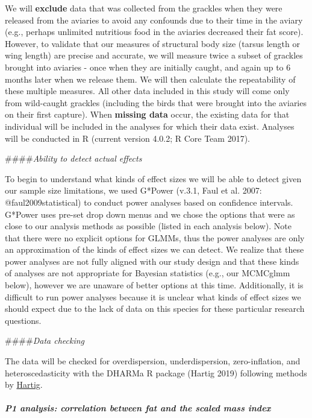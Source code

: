\documentclass[
]{article}
\begin{document}
We will \textbf{exclude} data that was collected from the grackles when
they were released from the aviaries to avoid any confounds due to their
time in the aviary (e.g., perhaps unlimited nutritious food in the
aviaries decreased their fat score). However, to validate that our
measures of structural body size (tarsus length or wing length) are
precise and accurate, we will measure twice a subset of grackles brought
into aviaries - once when they are initially caught, and again up to 6
months later when we release them. We will then calculate the
repeatability of these multiple measures. All other data included in
this study will come only from wild-caught grackles (including the birds
that were brought into the aviaries on their first capture). When
\textbf{missing data} occur, the existing data for that individual will
be included in the analyses for which their data exist. Analyses will be
conducted in R (current version 4.0.2; R Core Team 2017).

\#\#\#\#\emph{Ability to detect actual effects}

To begin to understand what kinds of effect sizes we will be able to
detect given our sample size limitations, we used G*Power (v.3.1, Faul
et al. 2007: @faul2009statistical) to conduct power analyses based on
confidence intervals. G*Power uses pre-set drop down menus and we chose
the options that were as close to our analysis methods as possible
(listed in each analysis below). Note that there were no explicit
options for GLMMs, thus the power analyses are only an approximation of
the kinds of effect sizes we can detect. We realize that these power
analyses are not fully aligned with our study design and that these
kinds of analyses are not appropriate for Bayesian statistics (e.g., our
MCMCglmm below), however we are unaware of better options at this time.
Additionally, it is difficult to run power analyses because it is
unclear what kinds of effect sizes we should expect due to the lack of
data on this species for these particular research questions.

\#\#\#\#\emph{Data checking}

The data will be checked for overdispersion, underdispersion,
zero-inflation, and heteroscedasticity with the DHARMa R package (Hartig
2019) following methods by
\href{https://cran.r-project.org/web/packages/DHARMa/vignettes/DHARMa.html}{Hartig}.

\hypertarget{p1-analysis-correlation-between-fat-and-the-scaled-mass-index}{%
\paragraph{\texorpdfstring{\emph{P1 analysis: correlation between fat
and the scaled mass
index}}{P1 analysis: correlation between fat and the scaled mass index}}\label{p1-analysis-correlation-between-fat-and-the-scaled-mass-index}}
\end{document}
